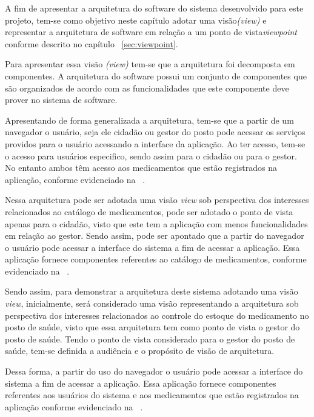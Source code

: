 A fim de apresentar a arquitetura do software do sistema desenvolvido para este projeto, tem-se como objetivo neste capítulo adotar uma visão\emph{(view)} e representar a arquitetura de software em relação a um ponto de vista\emph{viewpoint} conforme descrito no capítulo ~\ref{sec:viewpoint}.

Para apresentar essa visão \emph{(view)} tem-se que a arquitetura foi decomposta em componentes. A arquitetura do software possui um conjunto de componentes que são organizados de acordo com as funcionalidades que este componente deve prover no sistema de software. 

%

Apresentando de forma generalizada a arquitetura, tem-se que a partir de um navegador o usuário, seja ele cidadão ou gestor do posto pode acessar os serviços providos para o usuário acessando a interface da aplicação. Ao ter acesso, tem-se o acesso para usuários especifico, sendo assim para o cidadão ou para o gestor. No entanto ambos têm acesso aos medicamentos que estão registrados na aplicação, conforme evidenciado na  ~.

Nessa arquitetura pode ser adotada uma visão \emph{view} sob perspectiva dos interesses relacionados ao catálogo de medicamentos, pode ser adotado o ponto de vista apenas para o cidadão, visto que este tem a aplicação com menos funcionalidades em relação ao gestor. Sendo assim, pode ser apontado que a partir do navegador o usuário pode acessar a interface do sistema a fim de acessar a aplicação. Essa aplicação fornece componentes referentes ao catálogo de medicamentos, conforme evidenciado na ~.


Sendo assim, para demonstrar a arquitetura deste sistema adotando uma visão \emph{view}, inicialmente, será considerado uma visão  representando a arquitetura sob perspectiva dos interesses relacionados ao controle do estoque do medicamento no posto de saúde, visto que essa arquitetura tem como ponto de vista o gestor do posto de saúde. Tendo o ponto de vista considerado para o gestor do posto de saúde, tem-se definida a audiência e o propósito de visão de arquitetura.

Dessa forma, a partir do uso do navegador o usuário pode acessar a interface do sistema a fim de acessar a aplicação. Essa aplicação fornece componentes referentes aos usuários do sistema e aos medicamentos que estão registrados na aplicação conforme evidenciado na ~.

